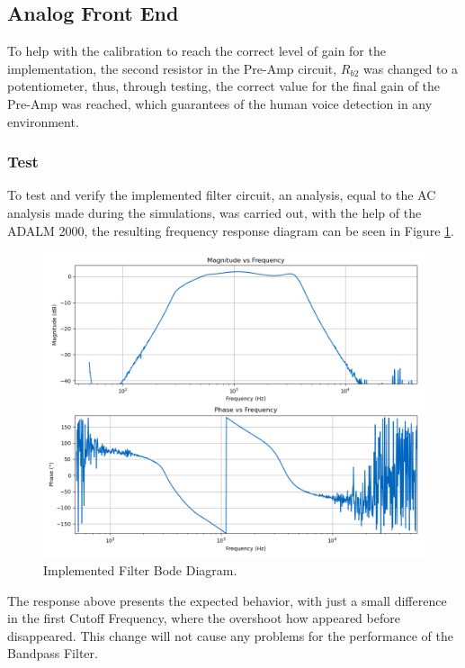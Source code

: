 \subsection{Analog Front End}

To help with the calibration to reach the correct level of gain for the implementation, the second resistor in the Pre-Amp circuit, $R_{b2}$ was changed to a potentiometer, thus, through testing, the correct value for the final gain of the Pre-Amp was reached, which guarantees of the human voice detection in any environment.

\subsubsection{Test}

To test and verify the implemented filter circuit, an analysis, equal to the AC analysis made during the simulations, was carried out, with the help of the ADALM 2000, the resulting frequency response diagram can be seen in Figure \ref{fig:AnalogFilterBodeScoppy}.

\begin{figure}[H]
    \centering
    \includegraphics*[scale = 0.5]{Images/AnalogFilterScoppyBode.png}
    \caption{Implemented Filter Bode Diagram.}
    \label{fig:AnalogFilterBodeScoppy}
\end{figure}

The response above presents the expected behavior, with just a small difference in the first Cutoff Frequency, where the overshoot how appeared before disappeared. This change will not cause any problems for the performance of the Bandpass Filter.

